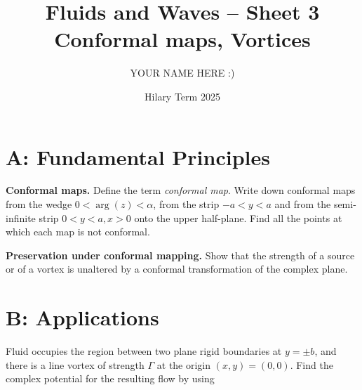 \documentclass[answers]{exam}
\title{Fluids and Waves -- Sheet 3\\Conformal maps, Vortices}
\author{YOUR NAME HERE :)}
\date{Hilary Term 2025}
\begin{document}
\maketitle
\begin{questions}

\section*{A: Fundamental Principles}

\question%
\textbf{Conformal maps.} Define the term \emph{conformal map}. Write down conformal maps from the wedge $0<\arg (z)<\alpha$, from the strip $-a<y<a$ and from the semi-infinite strip $0<y<a, x>0$ onto the upper half-plane. Find all the points at which each map is not conformal.



\question%
\textbf{Preservation under conformal mapping.} Show that the strength of a source or of a vortex is unaltered by a conformal transformation of the complex plane.



\section*{B: Applications}

\question%
Fluid occupies the region between two plane rigid boundaries at $y= \pm b$, and there is a line vortex of strength $\Gamma$ at the origin $(x, y)=(0,0)$. Find the complex potential for the resulting flow by using



\question%
\end{questions}
\end{document}
